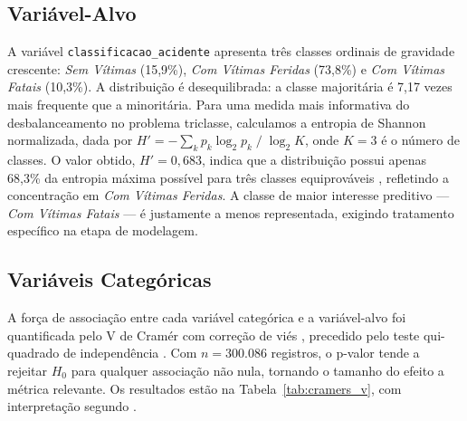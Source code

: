 \documentclass[12pt]{article}
\begin{document}
\subsection{Variável-Alvo}

A variável \texttt{classificacao\_acidente} apresenta três classes
ordinais de gravidade crescente: \textit{Sem Vítimas} (15,9\%),
\textit{Com Vítimas Feridas} (73,8\%) e \textit{Com Vítimas Fatais}
(10,3\%). A distribuição é desequilibrada: a classe majoritária é
7,17 vezes mais frequente que a minoritária. Para uma medida mais
informativa do desbalanceamento no problema triclasse, calculamos
a entropia de Shannon normalizada, dada por
$H' = -\sum_{k} p_k \log_2 p_k \;/\; \log_2 K$, onde $K = 3$ é o
número de classes. O valor obtido, $H' = 0{,}683$, indica que a
distribuição possui apenas 68,3\% da entropia máxima possível para
três classes equiprováveis \cite{shannon:1948}, refletindo a
concentração em \textit{Com Vítimas Feridas}. A classe de maior
interesse preditivo — \textit{Com Vítimas Fatais} — é justamente
a menos representada, exigindo tratamento específico
na etapa de modelagem.



\subsection{Variáveis Categóricas}

A força de associação entre cada variável categórica e a
variável-alvo foi quantificada pelo V de Cramér com correção de
viés \cite{bergsma:2013}, precedido pelo teste qui-quadrado de
independência \cite{pearson:1900}. Com $n = 300.086$ registros,
o p-valor tende a rejeitar $H_0$ para qualquer associação não nula,
tornando o tamanho do efeito a métrica relevante. Os resultados
estão na Tabela~\ref{tab:cramers_v}, com interpretação segundo
\cite{cohen:1988}.
\end{document}
